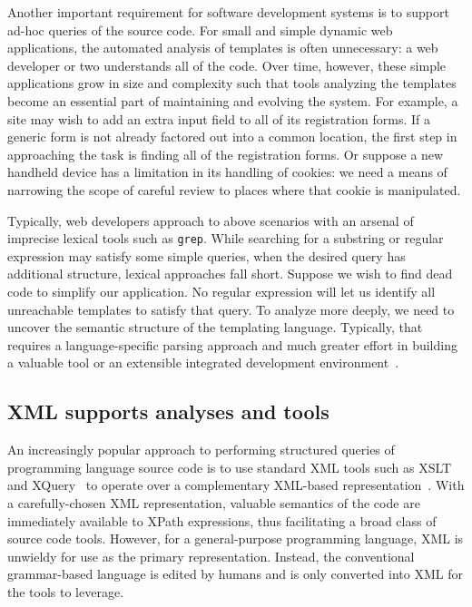 \documentclass{www2003-submission}
\newcommand{\smtexttt}[1]{{\small\texttt{#1}}}
\begin{document}
Another important requirement for software development systems is to
support ad-hoc queries of the source code. For small and simple
dynamic web applications, the automated analysis of templates is often
unnecessary: a web developer or two understands all of the code.  Over
time, however, these simple applications grow in size and complexity
such that tools analyzing the templates become an essential part of
maintaining and evolving the system. For example, a site may wish to
add an extra input field to all of its registration forms.  If a
generic form is not already factored out into a common location, the
first step in approaching the task is finding all of the registration
forms.  Or suppose a new handheld device has a limitation in its
handling of cookies: we need a means of narrowing the scope of careful
review to places where that cookie is manipulated.

Typically, web developers approach to above scenarios with an arsenal
of imprecise lexical tools such as \smtexttt{grep}.  While searching
for a substring or regular expression may satisfy some simple queries,
when the desired query has additional structure, lexical approaches
fall short.  Suppose we wish to find dead code to simplify our
application. No regular expression will let us identify all
unreachable templates to satisfy that query.  To analyze more deeply,
we need to uncover the semantic structure of the templating language.
Typically, that requires a language-specific parsing approach and much
greater effort in building a valuable tool or an extensible integrated
development environment~\cite{Montana,Eclipse}.

\subsection{XML supports analyses and tools}

An increasingly popular approach to performing structured queries of
programming language source code is to use standard XML tools such as
XSLT~\cite{XSLT} and XQuery~\cite{XQuery} to operate over a
complementary XML-based representation~\cite{Badros-www9,others}.
With a carefully-chosen XML representation, valuable semantics of the
code are immediately available to XPath expressions, thus facilitating
a broad class of source code tools.  However, for a general-purpose
programming language, XML is unwieldy for use as the primary
representation.  Instead, the conventional grammar-based language is
edited by humans and is only converted into XML for the tools to
leverage.
\end{document}
